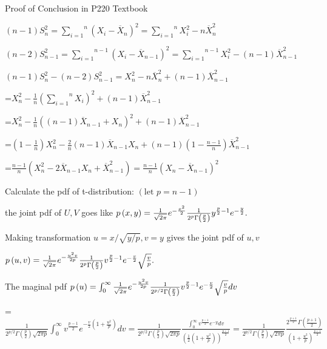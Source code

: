 \documentclass{article}
\begin{document}


Proof of Conclusion in P220 Textbook

$\left( n-1\right) S_{n}^{2}=\overset{n}{\underset{i=1}{\sum }}\left( X_{i}-%
\overline{X}_{n}\right) ^{2}=\overset{n}{\underset{i=1}{\sum }}X_{i}^{2}-n%
\overline{X}_{n}^{2}$

$\left( n-2\right) S_{n-1}^{2}=\overset{n-1}{\underset{i=1}{\sum }}\left(
X_{i}-\overline{X}_{n-1}\right) ^{2}=\overset{n-1}{\underset{i=1}{\sum }}%
X_{i}^{2}-\left( n-1\right) \overline{X}_{n-1}^{2}$

$\left( n-1\right) S_{n}^{2}-\left( n-2\right) S_{n-1}^{2}=X_{n}^{2}-n%
\overline{X}_{n}^{2}+\left( n-1\right) \overline{X}_{n-1}^{2}$

=$X_{n}^{2}-\frac{1}{n}\left( \overset{n}{\underset{i=1}{\sum }}X_{i}\right)
^{2}+\left( n-1\right) \overline{X}_{n-1}^{2}$

=$X_{n}^{2}-\frac{1}{n}\left( \left( n-1\right) \overline{X}%
_{n-1}+X_{n}\right) ^{2}+\left( n-1\right) \overline{X}_{n-1}^{2}$

=$\left( 1-\frac{1}{n}\right) X_{n}^{2}-\frac{2}{n}\left( n-1\right) 
\overline{X}_{n-1}X_{n}+\left( n-1\right) \left( 1-\frac{n-1}{n}\right) 
\overline{X}_{n-1}^{2}$

=$\frac{n-1}{n}\left( X_{n}^{2}-2\overline{X}_{n-1}X_{n}+\overline{X}%
_{n-1}^{2}\right) =\frac{n-1}{n}\left( X_{n}-\overline{X}_{n-1}\right) ^{2}$


Calculate the pdf of t-distribution: $\left( \text{let }p=n-1\right) $

the joint pdf of $U,V$ goes like $p\left( x,y\right) =\frac{1}{\sqrt{2\pi }}%
e^{-\frac{x^{2}}{2}}\frac{1}{2^{p}\Gamma \left( \frac{p}{2}\right) }y^{\frac{%
p}{2}-1}e^{-\frac{y}{2}}.$

Making transformation $u=x/\sqrt{y/p},v=y$ gives the joint pdf of $u,v$

$p\left( u,v\right) =\frac{1}{\sqrt{2\pi }}e^{-\frac{u^{2}v}{2p}}\frac{1}{%
2^{p}\Gamma \left( \frac{p}{2}\right) }v^{\frac{p}{2}-1}e^{-\frac{v}{2}}%
\sqrt{\frac{v}{p}}.$

The maginal pdf $p\left( u\right) =\int_{0}^{\infty }\frac{1}{\sqrt{2\pi }}%
e^{-\frac{u^{2}v}{2p}}\frac{1}{2^{p/2}\Gamma \left( \frac{p}{2}\right) }v^{%
\frac{p}{2}-1}e^{-\frac{v}{2}}\sqrt{\frac{v}{p}}dv$

=$\frac{1}{2^{p/2}\Gamma \left( \frac{p}{2}\right) \sqrt{2\pi p}}%
\int_{0}^{\infty }v^{\frac{p-1}{2}}e^{-\frac{v}{2}\left( 1+\frac{u^{2}}{p}%
\right) }dv=\frac{1}{2^{p/2}\Gamma \left( \frac{p}{2}\right) \sqrt{2\pi p}}%
\frac{\int_{0}^{\infty }v^{\frac{p-1}{2}}e^{-y}dv}{\left( \frac{1}{2}\left(
1+\frac{u^{2}}{p}\right) \right) ^{\frac{p+1}{2}}}=\frac{1}{2^{p/2}\Gamma
\left( \frac{p}{2}\right) \sqrt{2\pi p}}\frac{2^{\frac{p+1}{2}}\Gamma \left( 
\frac{p+1}{2}\right) }{\left( 1+\frac{u^{2}}{p}\right) ^{\frac{p+1}{2}}}$
\end{document}
